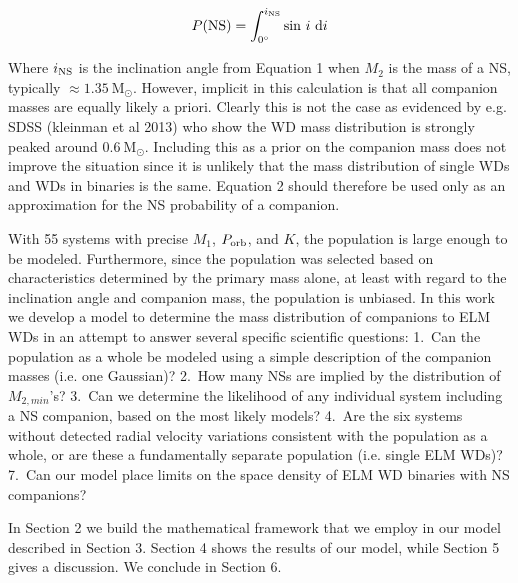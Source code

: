 \documentclass[letterpaper,12pt,preprint]{aastex}
\newcommand{\Msun}{\mathrm{M}_\odot}
\begin{document}
\begin{equation}
P({\rm NS}) = \int_{0^{\circ}}^{i_{\rm NS}} {\rm sin}\ i\ {\rm d}i
\end{equation}

Where $i_{\rm NS}$ is the inclination angle from Equation 1 when $M_2$ is the mass of a NS, typically $\approx1.35~\Msun$. However, implicit in this calculation is that all companion masses are equally likely a priori. Clearly this is not the case as evidenced by e.g. SDSS (kleinman et al 2013) who show the WD mass distribution is strongly peaked around $0.6~\Msun$. Including this as a prior on the companion mass does not improve the situation since it is unlikely that the mass distribution of single WDs and WDs in binaries is the same. Equation 2 should therefore be used only as an approximation for the NS probability of a companion.


With 55 systems with precise $M_1$, $P_{\rm orb}$, and $K$, the population is large enough to be modeled. Furthermore, since the population was selected based on characteristics determined by the primary mass alone, at least with regard to the inclination angle and companion mass, the population is unbiased. In this work we develop a model to determine the mass distribution of companions to ELM WDs in an attempt to answer several specific scientific questions: 1.\ Can the population as a whole be modeled using a simple description of the companion masses (i.e. one Gaussian)? 2.\ How many NSs are implied by the distribution of $M_{2,min}$'s? 3.\ Can we determine the likelihood of any individual system including a NS companion, based on the most likely models? 4.\ Are the six systems without detected radial velocity variations consistent with the population as a whole, or are these a fundamentally separate population (i.e. single ELM WDs)? 7.\ Can our model place limits on the space density of ELM WD binaries with NS companions? 


In Section 2 we build the mathematical framework that we employ in our model described in Section 3. Section 4 shows the results of our model, while Section 5 gives a discussion. We conclude in Section 6.
\end{document}
